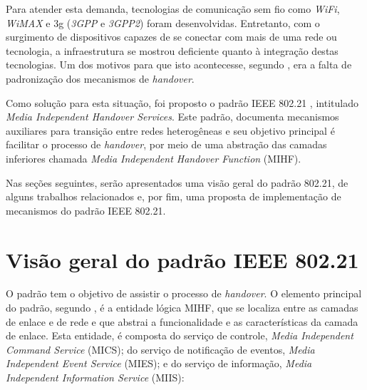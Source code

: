 \documentclass[12pt]{article}
\begin{document}
Para atender esta demanda, tecnologias de comunicação sem fio como 
\textit{WiFi}, \textit{WiMAX} e 3g (\textit{3GPP} e \textit{3GPP2}) foram 
desenvolvidas.  Entretanto, com o surgimento de dispositivos capazes de se 
conectar com mais de uma rede ou tecnologia, a infraestrutura se mostrou 
deficiente quanto à integração destas tecnologias. Um dos motivos para que 
isto acontecesse, segundo \cite{piri:2009}, era a falta de padronização dos 
mecanismos de \textit{handover}.  

Como solução para esta situação, foi proposto o padrão IEEE 802.21  
\cite{ieee:2008:80221}, intitulado \textit{Media Independent Handover 
Services}. Este padrão, documenta mecanismos auxiliares para transição entre 
redes heterogêneas e seu objetivo principal é facilitar o processo de 
\textit{handover}, por meio de uma abstração das camadas inferiores chamada 
\textit{Media Independent Handover Function} (MIHF).

Nas seções seguintes, serão apresentados uma visão geral do padrão 802.21, de 
alguns trabalhos relacionados e, por fim, uma proposta de implementação de 
mecanismos do padrão IEEE 802.21.


\section{Visão geral do padrão IEEE 802.21} \label{sec:padrao}  %

O padrão tem o objetivo de assistir o processo de \textit{handover}. O 
elemento principal do padrão, segundo \cite{piri:2009}, é a entidade lógica 
MIHF, que se localiza entre as camadas de enlace e de rede e que abstrai a 
funcionalidade e as características da camada de enlace.  Esta entidade, é 
composta do serviço de controle, \textit{Media Independent Command Service} 
(MICS); do serviço de notificação de eventos, \textit{Media Independent Event 
Service} (MIES); e do serviço de informação, \textit{Media Independent 
Information Service} (MIIS):
\end{document}
